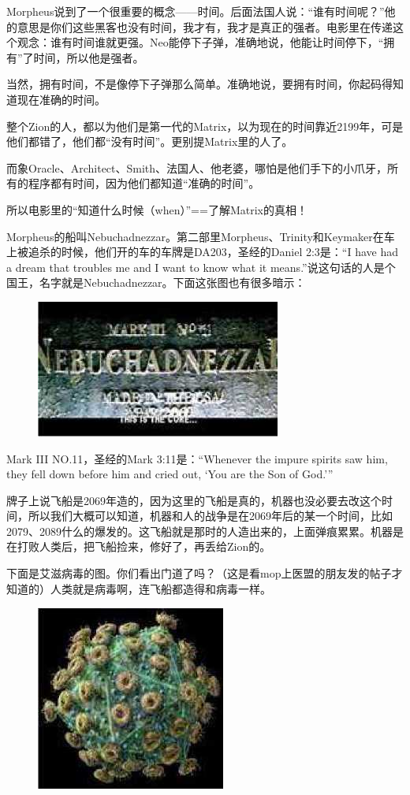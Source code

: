 \documentclass[UTF8]{ctexart}
\begin{document}
Morpheus说到了一个很重要的概念——时间。后面法国人说：“谁有时间呢？”他的意思是你们这些黑客也没有时间，我才有，我才是真正的强者。电影里在传递这个观念：谁有时间谁就更强。Neo能停下子弹，准确地说，他能让时间停下，“拥有”了时间，所以他是强者。

当然，拥有时间，不是像停下子弹那么简单。准确地说，要拥有时间，你起码得知道现在准确的时间。

整个Zion的人，都以为他们是第一代的Matrix，以为现在的时间靠近2199年，可是他们都错了，他们都“没有时间”。更别提Matrix里的人了。

而象Oracle、Architect、Smith、法国人、他老婆，哪怕是他们手下的小爪牙，所有的程序都有时间，因为他们都知道“准确的时间”。

所以电影里的“知道什么时候（when）”==了解Matrix的真相！

Morpheus的船叫Nebuchadnezzar。第二部里Morpheus、Trinity和Keymaker在车上被追杀的时候，他们开的车的车牌是DA203，圣经的Daniel 2:3是：“I have had a dream that troubles me and I want to know what it means.”说这句话的人是个国王，名字就是Nebuchadnezzar。下面这张图也有很多暗示：

\begin{figure}[htb]
\centering
\includegraphics[width=0.5\linewidth]{fig/read_Matrix-27}
\end{figure}

Mark III NO.11，圣经的Mark 3:11是：“Whenever the impure spirits saw him, they fell down before him and cried out, `You are the Son of God.'”

牌子上说飞船是2069年造的，因为这里的飞船是真的，机器也没必要去改这个时间，所以我们大概可以知道，机器和人的战争是在2069年后的某一个时间，比如2079、2089什么的爆发的。这飞船就是那时的人造出来的，上面弹痕累累。机器是在打败人类后，把飞船捡来，修好了，再丢给Zion的。

下面是艾滋病毒的图。你们看出门道了吗？（这是看mop上医盟的朋友发的帖子才知道的）人类就是病毒啊，连飞船都造得和病毒一样。

\begin{figure}[htb]
\centering
\includegraphics[width=0.5\linewidth]{fig/read_Matrix-28}
\end{figure}
\end{document}
